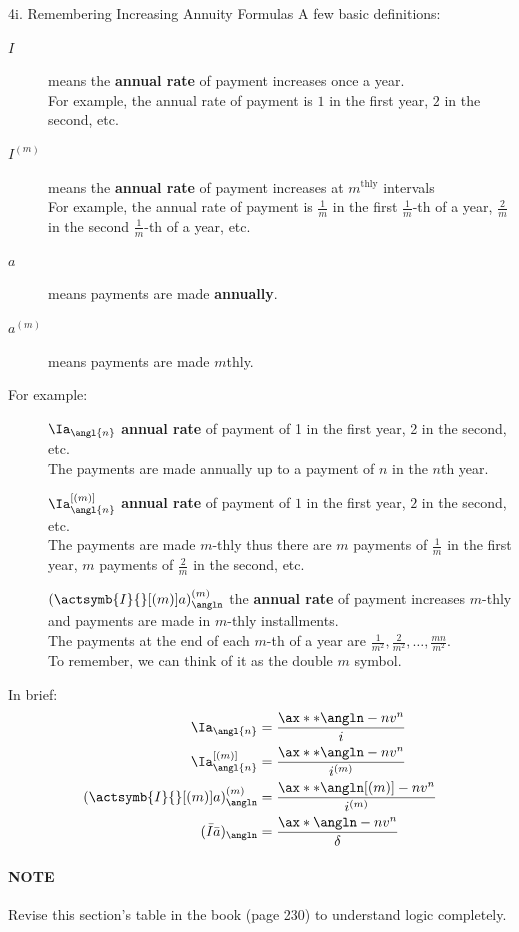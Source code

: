 \begin{CHPT_SUMM_AUTO}[label = {L.-4i}]{4i. Remembering Increasing Annuity Formulas}
A few basic definitions:
\begin{description}
	\item[$I$]	means the \textbf{annual rate} of payment increases once a year.\\
	For example, the annual rate of payment is $1$ in the first year, $2$ in the second, etc.
	\item[$I^{(m)}$]	means the \textbf{annual rate} of payment increases at $m^{\text{thly}}$ intervals\\
	For example, the annual rate of payment is $\frac{1}{m}$ in the first $\frac{1}{m}$-th of a year, $\frac{2}{m}$ in the second $\frac{1}{m}$-th of a year, etc.
	\item[$a$]	means payments are made \textbf{annually}.
	\item[$a^{(m)}$]	means payments are made $m$thly.
\end{description}

For example:
\begin{description}
	\item[]	$\Ia_{\angl{n}}$	\textbf{annual rate} of payment of 1 in the first year, 2 in the second, etc.\\
	The payments are made annually up to a payment of $n$ in the $n$th year.
	\item[]	$\Ia_{\angl{n}}^{[(m)]}$	\textbf{annual rate} of payment of $1$ in the first year, $2$ in the second, etc.\\
	The payments are made $m$-thly thus there are $m$ payments of $\frac{1}{m}$ in the first year, $m$ payments of $\frac{2}{m}$ in the second, etc.
	\item[]	$(\actsymb{I}{}[(m)]a)_{\angln}^{(m)}$	the \textbf{annual rate} of payment increases $m$-thly and payments are made in $m$-thly installments.\\
	The payments at the end of each $m$-th of a year are $\frac{1}{m^{2}}, \frac{2}{m^{2}}, \dots, \frac{mn}{m^{2}}$.\\
	To remember, we can think of it as the \og double $m$ \fg{} symbol.
\end{description}

In brief:
\begin{align*}
	\Ia_{\angl{n}}	
	&=	\frac{\ax**{\angln} - nv^{n}}{i}	\\
	\Ia_{\angl{n}}^{[(m)]}
	&=	\frac{\ax**{\angln} - nv^{n}}{i^{(m)}}	\\
	(\actsymb{I}{}[(m)]a)_{\angln}^{(m)}
	&=	\frac{\ax**{\angln}[(m)] - nv^{n}}{i^{(m)}}	\\
	(\bar{I}\bar{a})_{\angln}
	&=	\frac{\ax*{\angln} - nv^{n}}{\delta}
\end{align*}

\paragraph*{NOTE}	Revise this section's table in the book (page 230) to understand logic completely.
\end{CHPT_SUMM_AUTO}

